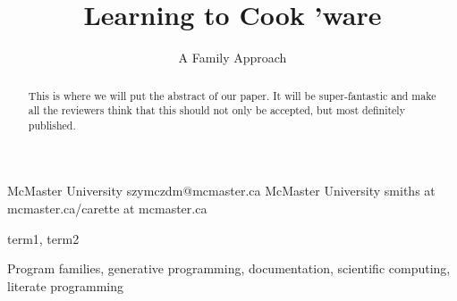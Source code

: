 \documentclass[10pt, preprint]{sigplanconf}
\begin{document}
\setlength{\pdfpageheight}{\paperheight}
\setlength{\pdfpagewidth}{\paperwidth}






\title{Learning to Cook 'ware}
\subtitle{A Family Approach} %

           {McMaster University}
           {szymczdm@mcmaster.ca}
           {McMaster University}
           {smiths at mcmaster.ca/carette at mcmaster.ca}

\maketitle

\begin{abstract}
  This is where we will put the abstract of our paper. It will be
  super-fantastic and make all the reviewers think that this should not only be
  accepted, but most definitely published. %
\end{abstract}


\terms
term1, term2 %

\keywords Program families, generative programming, documentation, scientific
computing, literate programming %
\end{document}
